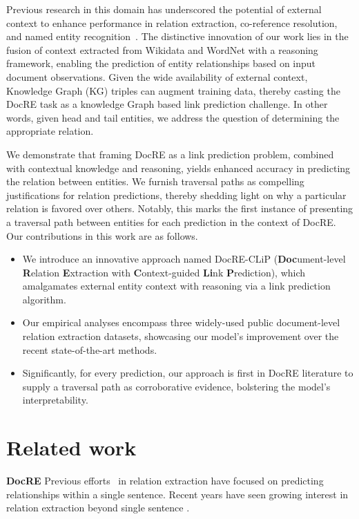 \documentclass[letterpaper]{article} %
\begin{document}
Previous research in this domain has underscored the potential of external context to enhance performance in relation extraction, co-reference resolution, and named entity recognition~\cite{shimorina-etal-2022-knowledge}.
The distinctive innovation of our work lies in the fusion of context extracted from Wikidata and WordNet with a reasoning framework, enabling the prediction of entity relationships based on input document observations. Given the wide availability of external context, Knowledge Graph (KG) triples can augment training data, thereby casting the DocRE task as a knowledge Graph based link prediction challenge. In other words, given head and tail entities, we address the question of determining the appropriate relation.

We demonstrate that framing DocRE as a link prediction problem, combined with contextual knowledge and reasoning, yields enhanced accuracy in predicting the relation between entities. We furnish traversal paths as compelling justifications for relation predictions, thereby shedding light on why a particular relation is favored over others. Notably, this marks the first instance of presenting a traversal path between entities for each prediction in the context of DocRE. Our contributions in this work are as follows.

\begin{itemize}
  \item We introduce an innovative approach named DocRE-CLiP (\textbf{Doc}ument-level \textbf{R}elation \textbf{E}xtraction with \textbf{C}ontext-guided \textbf{Li}nk \textbf{P}rediction), which amalgamates external entity context with reasoning via a link prediction algorithm.
  \item  Our empirical analyses encompass three widely-used public document-level relation extraction datasets, showcasing our model's improvement over the recent state-of-the-art methods.
  \item Significantly, for every prediction, our approach is first in DocRE literature to supply a traversal path as corroborative evidence, bolstering the model's interpretability.
\end{itemize}





\section{Related work}
\textbf{DocRE} Previous efforts~\cite{zhang-etal-2018-graph, 10.1007/978-3-031-43421-1_14} in relation extraction have focused on predicting relationships within a single sentence. Recent years have seen growing interest in relation extraction beyond single sentence \cite{yao-etal-2019-docred}.
\end{document}
